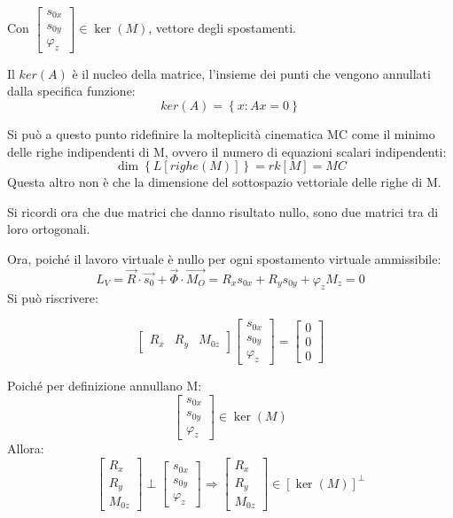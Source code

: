 \documentclass{article}
\begin{document}
\begin{adjustwidth}{2in}{}
Con {\small $ \left[\begin{array}{c}
	s_{0x} \\
	s_{0y} \\
	\varphi_{z}
\end{array}\right] \in \ker(M)$}, vettore degli spostamenti.

Il $ker(A)$ è il nucleo della matrice, l'insieme dei punti che vengono annullati dalla specifica funzione:
\[
ker(A) = \left\lbrace x : Ax =0 \right\rbrace 
\]

Si può a questo punto ridefinire la molteplicità cinematica MC come il minimo delle righe indipendenti di M, ovvero il numero di equazioni scalari indipendenti:
\[
\dim\left\lbrace L[righe(M)] \right\rbrace = rk[M] = MC
\]
Questa altro non è che la dimensione del sottospazio vettoriale delle righe di M. \newline

Si ricordi ora che due matrici che danno risultato nullo, sono due matrici tra di loro ortogonali. \newline

Ora, poiché il lavoro virtuale è nullo per ogni spostamento virtuale ammissibile:
\[
L_{V} = \vec{R} \cdot \vec{s_{0}}  + \vec{\Phi} \cdot \vec{M_{O}} = R_{x}s_{0x} + R_{y}s_{0y} + \varphi_{z}M_{z} = 0
\]
Si può riscrivere:

\[
\left[ \begin{array}{ccc}
	R_{x} & R_{y} & M_{0z}
\end{array} \right] \left[\begin{array}{c}
s_{0x} \\
s_{0y} \\
\varphi_{z}
\end{array}\right] = \left[\begin{array}{c}
0 \\
0 \\
0
\end{array}\right]
\]

Poiché per definizione annullano M:
\[
\left[\begin{array}{c}
	s_{0x} \\
	s_{0y} \\
	\varphi_{z}
\end{array}\right] \in \ker(M)
\]
Allora: 
\[
\left[\begin{array}{c}
	R_{x} \\
	R_{y} \\
	M_{0z}
\end{array}\right] \perp \left[\begin{array}{c}
	s_{0x} \\
	s_{0y} \\
	\varphi_{z}
\end{array}\right] \Rightarrow \left[\begin{array}{c}
R_{x} \\
R_{y} \\
M_{0z}
\end{array}\right] \in [\ker(M)]^{\perp}
\]


\end{adjustwidth}
\end{document}
